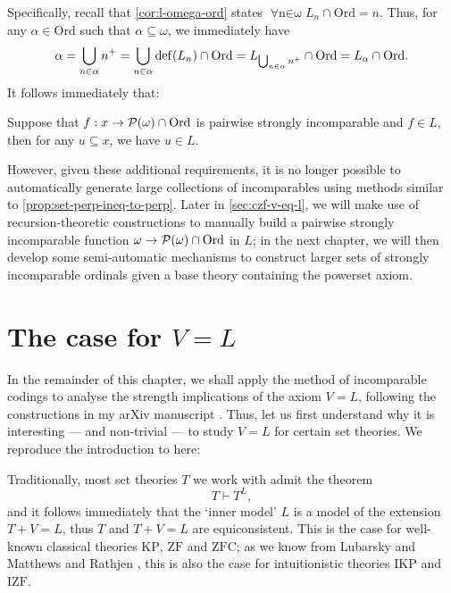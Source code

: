\documentclass[12pt,openany]{book}
\theoremstyle{plain}
\theoremstyle{definition}
\newcommand\opA[1]{\mathop{\forall #1}}
\newcommand\Pow{\mathcal{P}}
\DeclareMathOperator\dd{def}
\newcommand\KP{\mathrm{KP}}
\newcommand\IKP{\mathrm{IKP}}
\newcommand\IZF{\mathrm{IZF}}
\newcommand\ZF{\mathrm{ZF}}
\newcommand\ZFC{\mathrm{ZFC}}
\newcommand\Ord{\mathrm{Ord}}
\begin{document}
Specifically, recall that \autoref{cor:l-omega-ord} states $\opA{n \in \omega} L_n \cap \Ord = n$. Thus, for any $\alpha \in \Ord$ such that $\alpha \subseteq \omega$, we immediately have
\[\alpha = \bigcup_{n \in \alpha} n^+ = \bigcup_{n \in \alpha} \dd\mleft(L_n\mright) \cap \Ord = L_{\bigcup_{n \in \alpha} n^+} \cap \Ord = L_\alpha \cap \Ord.\]
It follows immediately that:
\begin{corollary}
  \label{cor:omega-sub-strong-incom-code}
  Suppose that $f : x \rightarrow \Pow\mleft(\omega\mright) \cap \Ord$ is pairwise strongly incomparable and $f \in L$, then for any $u \subseteq x$, we have $u \in L$.
\end{corollary}

However, given these additional requirements, it is no longer possible to automatically generate large collections of incomparables using methods similar to \autoref{prop:set-perp-ineq-to-perp}. Later in \autoref{sec:czf-v-eq-l}, we will make use of recursion-theoretic constructions to manually build a pairwise strongly incomparable function $\omega \rightarrow \Pow\mleft(\omega\mright) \cap \Ord$ in $L$; in the next chapter, we will then develop some semi-automatic mechanisms to construct larger sets of strongly incomparable ordinals given a base theory containing the powerset axiom.

\section{The case for \texorpdfstring{$V = L$}{V = L}}
\label{sec:overview-v-eq-l}

In the remainder of this chapter, we shall apply the method of incomparable codings to analyse the strength implications of the axiom $V = L$, following the constructions in my arXiv manuscript \cite{wang-sw26-czf-v-l-pre}. Thus, let us first understand why it is interesting --- and non-trivial --- to study $V = L$ for certain set theories. We reproduce the introduction to \cite{wang-sw26-czf-v-l-pre} here:

Traditionally, most set theories $T$ we work with admit the theorem
\[T \vdash T^L,\]
and it follows immediately that the `inner model' $L$ is a model of the extension $T + V = L$, thus $T$ and $T + V = L$ are equiconsistent. This is the case for well-known classical theories $\KP$, $\ZF$ and $\ZFC$; as we know from Lubarsky \cite{lubarsky93-intuitionistic-l} and Matthews and Rathjen \cite{matthews-rathjen24-constructible-universe}, this is also the case for intuitionistic theories $\IKP$ and $\IZF$.
\end{document}
